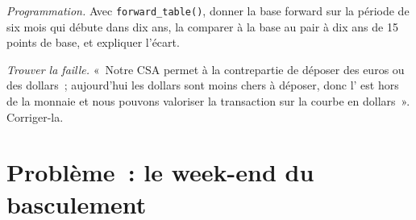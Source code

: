 \begin{exercise}[$\star\star\star$]\label{exo:rc:multi-curve-and-collateral-discounting:7}
\emph{Programmation.} Avec \texttt{forward\_table()}, donner la base forward sur la
période de six mois qui débute dans dix ans, la comparer à la base au pair à dix ans de
15 points de base, et expliquer l'écart.
\end{exercise}

\begin{exercise}[$\star\star\star$]\label{exo:rc:multi-curve-and-collateral-discounting:8}
\emph{Trouver la faille.} «~Notre CSA permet à la contrepartie de déposer des euros ou des dollars~;
aujourd'hui les dollars sont moins chers à déposer, donc l' est hors de la monnaie et nous
pouvons valoriser la transaction sur la courbe en dollars~». Corriger-la.
\end{exercise}

\section{Problème~: le week-end du basculement}

